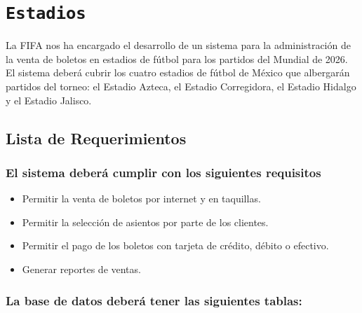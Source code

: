 \section{\texttt{Estadios}}


La FIFA nos ha encargado el desarrollo de un sistema para la administración de la venta de boletos
en estadios de fútbol para los partidos del Mundial de 2026. El sistema deberá cubrir los cuatro
estadios de fútbol de México que albergarán partidos del torneo: el Estadio Azteca,
el Estadio Corregidora, el Estadio Hidalgo y el Estadio Jalisco.


\subsection{Lista de Requerimientos}

\subsubsection*{El sistema deberá cumplir con los siguientes requisitos}

\begin{itemize}
    \item Permitir la venta de boletos por internet y en taquillas.
    \item Permitir la selección de asientos por parte de los clientes.
    \item Permitir el pago de los boletos con tarjeta de crédito, débito o efectivo.
    \item Generar reportes de ventas.
\end{itemize}

\subsubsection*{La base de datos deberá tener las siguientes tablas:}

